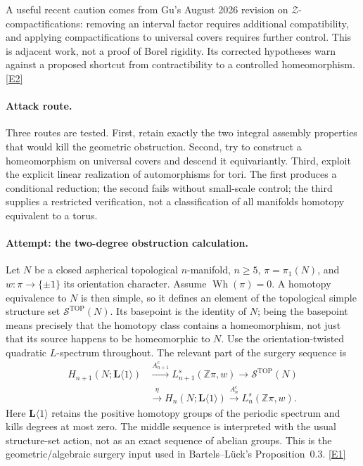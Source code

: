 \documentclass[11pt,a4paper]{article}
\newcommand{\Z}{\mathbb{Z}}
\newcommand{\eref}[2]{\hyperlink{extra:#1:#2}{[E#2]}}
\numberwithin{equation}{section}
\begin{document}
A useful recent caution comes from Gu's August 2026 revision on
$\mathcal Z$-compactifications: removing an interval factor requires
additional compatibility, and applying compactifications to universal
covers requires further control. This is adjacent work, not a proof of
Borel rigidity. Its corrected hypotheses warn against a proposed shortcut
from contractibility to a controlled homeomorphism. \eref{statement}{2}

\paragraph{Attack route.}
Three routes are tested. First, retain exactly the two integral assembly
properties that would kill the geometric obstruction. Second, try to
construct a homeomorphism on universal covers and descend it equivariantly.
Third, exploit the explicit linear realization of automorphisms for tori.
The first produces a conditional reduction; the second fails without
small-scale control; the third supplies a restricted verification, not a
classification of all manifolds homotopy equivalent to a torus.

\paragraph{Attempt: the two-degree obstruction calculation.}
Let $N$ be a closed aspherical topological $n$-manifold, $n\geq5$,
$\pi=\pi_1(N)$, and $w:\pi\to\{\pm1\}$ its orientation character.
Assume $\operatorname{Wh}(\pi)=0$. A homotopy equivalence to $N$ is then
simple, so it defines an element of the topological simple structure set
$\mathcal S^{\mathrm{TOP}}(N)$. Its basepoint is the identity of $N$;
being the basepoint means precisely that the homotopy class contains a
homeomorphism, not just that its source happens to be homeomorphic to $N$.
Use the orientation-twisted quadratic $L$-spectrum throughout.
The relevant part of the surgery sequence is
\begin{equation}\label{eq:statement:surgery}
\begin{split}
 H_{n+1}(N;\mathbf L\langle1\rangle)&\xrightarrow{A^c_{n+1}}
 L^s_{n+1}(\Z\pi,w)\longrightarrow\mathcal S^{\mathrm{TOP}}(N)\\
 &\xrightarrow{\eta}H_n(N;\mathbf L\langle1\rangle)
 \xrightarrow{A^c_n}L^s_n(\Z\pi,w).
\end{split}
\end{equation}
Here $\mathbf L\langle1\rangle$ retains the positive homotopy groups
of the periodic spectrum and kills degrees at most zero. The middle
sequence is interpreted with the usual structure-set action, not as an
exact sequence of abelian groups. This is the geometric/algebraic surgery
input used in Bartels--L\"uck's Proposition~0.3. \eref{statement}{1}
\end{document}
